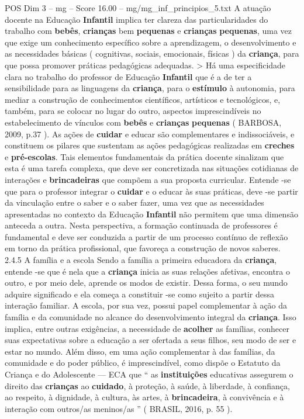 \begin{textsample}{POS Dim 3 – mg – Score 16.00 – mg/mg\_inf\_principios\_5.txt}
A atuação docente na Educação \textbf{Infantil} implica ter clareza das particularidades do trabalho com \textbf{bebês}, \textbf{crianças} bem \textbf{pequenas} e \textbf{crianças} \textbf{pequenas}, uma vez que exige um conhecimento específico sobre a aprendizagem, o desenvolvimento e as necessidades básicas ( cognitivas, sociais, emocionais, físicas ) da \textbf{criança}, para que possa promover práticas pedagógicas adequadas. > Há uma especificidade clara no trabalho do professor de Educação \textbf{Infantil} que é a de ter a sensibilidade para as linguagens da \textbf{criança}, para o \textbf{estímulo} à autonomia, para mediar a construção de conhecimentos científicos, artísticos e tecnológicos, e, também, para se colocar no lugar do outro, aspectos imprescindíveis no estabelecimento de vínculos com \textbf{bebês} e \textbf{crianças} \textbf{pequenas} ( BARBOSA, 2009, p.37 ).
As ações de \textbf{cuidar} e educar são complementares e indissociáveis, e constituem os pilares que sustentam as ações pedagógicas realizadas em \textbf{creches} e \textbf{pré-escolas}.
Tais elementos fundamentais da prática docente sinalizam que esta é uma tarefa complexa, que deve ser concretizada nas situações cotidianas de interações e \textbf{brincadeiras} que compõem a sua proposta curricular.
Entende -se que para o professor integrar o \textbf{cuidar} e o educar às suas práticas, deve -se partir da vinculação entre o saber e o saber fazer, uma vez que as necessidades apresentadas no contexto da Educação \textbf{Infantil} não permitem que uma dimensão anteceda a outra.
Nesta perspectiva, a formação continuada de professores é fundamental e deve ser conduzida a partir de um processo contínuo de reflexão em torno da prática profissional, que favoreça a construção de novos saberes. 2.4.5 A família e a escola Sendo a família a primeira educadora da \textbf{criança}, entende -se que é nela que a \textbf{criança} inicia as suas relações afetivas, encontra o outro, e por meio dele, aprende os modos de existir.
Dessa forma, o seu mundo adquire significado e ela começa a constituir -se como sujeito a partir dessa interação familiar.
A escola, por sua vez, possui papel complementar à ação da família e da comunidade no alcance do desenvolvimento integral da \textbf{criança}.
Isso implica, entre outras exigências, a necessidade de \textbf{acolher} as famílias, conhecer suas expectativas sobre a educação a ser ofertada a seus filhos, seu modo de ser e estar no mundo.
Além disso, em uma ação complementar à das famílias, da comunidade e do poder público, é imprescindível, como dispõe o Estatuto da Criança e do Adolescente — ECA que “ as \textbf{instituições} educativas assegurem o direito das \textbf{crianças} ao \textbf{cuidado}, à proteção, à saúde, à liberdade, à confiança, ao respeito, à dignidade, à cultura, às artes, à \textbf{brincadeira}, à convivência e à interação com outros/as meninos/as ” ( BRASIL, 2016, p. 55 ).

\end{textsample}
